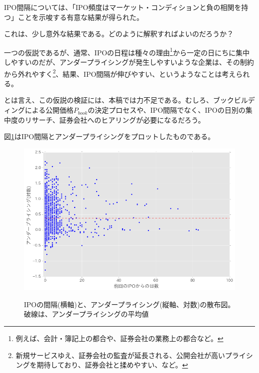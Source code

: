 \documentclass{jsarticle}
\begin{document}
IPO間隔については、「IPO頻度はマーケット・コンディションと負の相関を持つ」ことを示唆する有意な結果が得られた。\\ \par
これは、少し意外な結果である。どのように解釈すればよいのだろうか？\\ \par
一つの仮説であるが、通常、IPOの日程は種々の理由\footnote[19]{例えば、会計・簿記上の都合や、証券会社の業務上の都合など。}から一定の日にちに集中しやすいのだが、アンダープライシングが発生しやすいような企業は、その制約から外れやすく\footnote[20]{新規サービスゆえ、証券会社の監査が延長される、公開会社が高いプライシングを期待しており、証券会社と揉めやすい、など。}、結果、IPO間隔が伸びやすい、というようなことは考えられる。\par
とは言え、この仮説の検証には、本稿では力不足である。むしろ、ブックビルディングによる公開価格$P_{book}$の決定プロセスや、IPO間隔でなく、IPOの日別の集中度のリサーチ、証券会社へのヒアリングが必要になるだろう。

図\ref{interval}はIPO間隔とアンダープライシングをプロットしたものである。\par

\begin{figure}[!t]
  \begin{center}
  \caption{IPOの間隔(横軸)と、アンダープライシング(縦軸、対数)の散布図。破線は、アンダープライシングの平均値}
    \includegraphics[clip,width=14cm]{./interval.png}
    \label{interval}
  \end{center}
\end{figure}

\newpage
\end{document}
